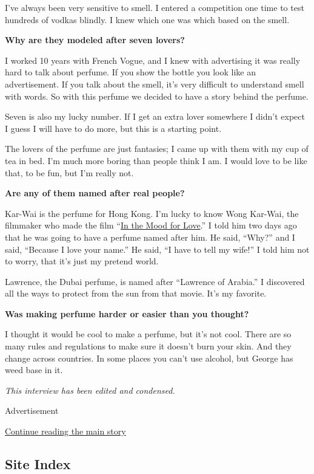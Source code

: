 I've always been very sensitive to smell. I entered a competition one
time to test hundreds of vodkas blindly. I knew which one was which
based on the smell.

\textbf{Why are they modeled after seven lovers?}

I worked 10 years with French Vogue, and I knew with advertising it was
really hard to talk about perfume. If you show the bottle you look like
an advertisement. If you talk about the smell, it's very difficult to
understand smell with words. So with this perfume we decided to have a
story behind the perfume.

Seven is also my lucky number. If I get an extra lover somewhere I
didn't expect I guess I will have to do more, but this is a starting
point.

The lovers of the perfume are just fantasies; I came up with them with
my cup of tea in bed. I'm much more boring than people think I am. I
would love to be like that, to be fun, but I'm really not.

\textbf{Are any of them named after real people?}

Kar-Wai is the perfume for Hong Kong. I'm lucky to know Wong Kar-Wai,
the filmmaker who made the film
``\href{https://www.nytimes3xbfgragh.onion/2018/06/19/fashion/these-movies-have-good-clothes.html}{In
the Mood for Love}.'' I told him two days ago that he was going to have
a perfume named after him. He said, ``Why?'' and I said, ``Because I
love your name.'' He said, ``I have to tell my wife!'' I told him not to
worry, that it's just my pretend world.

Lawrence, the Dubai perfume, is named after ``Lawrence of Arabia.'' I
discovered all the ways to protect from the sun from that movie. It's my
favorite.

\textbf{Was making perfume harder or easier than you thought?}

I thought it would be cool to make a perfume, but it's not cool. There
are so many rules and regulations to make sure it doesn't burn your
skin. And they change across countries. In some places you can't use
alcohol, but George has weed base in it.

\emph{This interview has been edited and condensed.}

Advertisement

\protect\hyperlink{after-bottom}{Continue reading the main story}

\hypertarget{site-index}{%
\subsection{Site Index}\label{site-index}}

